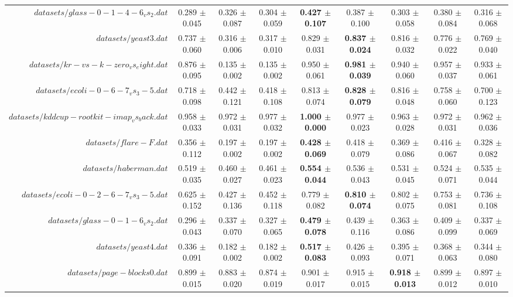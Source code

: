 \begin{table}[!ht]
{\begin{tabular}{r c c c c c c c c}
$datasets/glass-0-1-4-6_vs_2.dat$ & 0.289 $\pm$ 0.045 & 0.326 $\pm$ 0.087 & 0.304 $\pm$ 0.059 & \textbf{0.427 $\pm$ 0.107} & 0.387 $\pm$ 0.100 & 0.303 $\pm$ 0.058 & 0.380 $\pm$ 0.084 & 0.316 $\pm$ 0.068 \\
$datasets/yeast3.dat$ & 0.737 $\pm$ 0.060 & 0.316 $\pm$ 0.006 & 0.317 $\pm$ 0.010 & 0.829 $\pm$ 0.031 & \textbf{0.837 $\pm$ 0.024} & 0.816 $\pm$ 0.032 & 0.776 $\pm$ 0.022 & 0.769 $\pm$ 0.040 \\
$datasets/kr-vs-k-zero_vs_eight.dat$ & 0.876 $\pm$ 0.095 & 0.135 $\pm$ 0.002 & 0.135 $\pm$ 0.002 & 0.950 $\pm$ 0.061 & \textbf{0.981 $\pm$ 0.039} & 0.940 $\pm$ 0.060 & 0.957 $\pm$ 0.037 & 0.933 $\pm$ 0.061 \\
$datasets/ecoli-0-6-7_vs_3-5.dat$ & 0.718 $\pm$ 0.098 & 0.442 $\pm$ 0.121 & 0.418 $\pm$ 0.108 & 0.813 $\pm$ 0.074 & \textbf{0.828 $\pm$ 0.079} & 0.816 $\pm$ 0.048 & 0.758 $\pm$ 0.060 & 0.700 $\pm$ 0.123 \\
$datasets/kddcup-rootkit-imap_vs_back.dat$ & 0.958 $\pm$ 0.033 & 0.972 $\pm$ 0.031 & 0.977 $\pm$ 0.032 & \textbf{1.000 $\pm$ 0.000} & 0.977 $\pm$ 0.023 & 0.963 $\pm$ 0.028 & 0.972 $\pm$ 0.031 & 0.962 $\pm$ 0.036 \\
$datasets/flare-F.dat$ & 0.356 $\pm$ 0.112 & 0.197 $\pm$ 0.002 & 0.197 $\pm$ 0.002 & \textbf{0.428 $\pm$ 0.069} & 0.418 $\pm$ 0.079 & 0.369 $\pm$ 0.086 & 0.416 $\pm$ 0.067 & 0.328 $\pm$ 0.082 \\
$datasets/haberman.dat$ & 0.519 $\pm$ 0.035 & 0.460 $\pm$ 0.027 & 0.461 $\pm$ 0.023 & \textbf{0.554 $\pm$ 0.044} & 0.536 $\pm$ 0.043 & 0.531 $\pm$ 0.045 & 0.524 $\pm$ 0.071 & 0.535 $\pm$ 0.044 \\
$datasets/ecoli-0-2-6-7_vs_3-5.dat$ & 0.625 $\pm$ 0.152 & 0.427 $\pm$ 0.136 & 0.452 $\pm$ 0.118 & 0.779 $\pm$ 0.082 & \textbf{0.810 $\pm$ 0.074} & 0.802 $\pm$ 0.075 & 0.753 $\pm$ 0.081 & 0.736 $\pm$ 0.108 \\
$datasets/glass-0-1-6_vs_2.dat$ & 0.296 $\pm$ 0.043 & 0.337 $\pm$ 0.070 & 0.327 $\pm$ 0.065 & \textbf{0.479 $\pm$ 0.078} & 0.439 $\pm$ 0.116 & 0.363 $\pm$ 0.086 & 0.409 $\pm$ 0.099 & 0.337 $\pm$ 0.069 \\
$datasets/yeast4.dat$ & 0.336 $\pm$ 0.091 & 0.182 $\pm$ 0.002 & 0.182 $\pm$ 0.002 & \textbf{0.517 $\pm$ 0.083} & 0.426 $\pm$ 0.093 & 0.395 $\pm$ 0.071 & 0.368 $\pm$ 0.063 & 0.344 $\pm$ 0.080 \\
$datasets/page-blocks0.dat$ & 0.899 $\pm$ 0.015 & 0.883 $\pm$ 0.020 & 0.874 $\pm$ 0.019 & 0.901 $\pm$ 0.017 & 0.915 $\pm$ 0.015 & \textbf{0.918 $\pm$ 0.013} & 0.899 $\pm$ 0.012 & 0.897 $\pm$ 0.010 \\

\end{tabular}}
\end{table}
